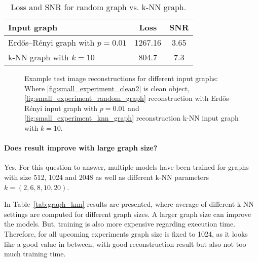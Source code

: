   \begin{table}[H]
    \centering
      \begin{tabular}{l|cc}
      \toprule
      \textbf{Input graph} & \textbf{Loss} & \textbf{SNR}  \\ 
      \midrule
      Erdős–Rényi graph with $p=0.01$    &  1267.16         &  3.65   \\ \hline
      k-NN graph with $k=10$             &  804.7           &  7.3    \\ \hline
      \midrule
      \end{tabular}
    \caption{Loss and SNR for random graph vs. k-NN graph. }
    \label{tab:input_graph}
  \end{table}
  
  \begin{figure}[H]
    \label{fig:input_graph_small}
    \hfill
    \hfill
    \hfill
    \hfill
	\caption{Example test image reconstructions for different input graphs:\\
  Where \ref{fig:small_experiment_clean2} is clean object, 
  \ref{fig:small_experiment_random_graph} reconstruction with Erdős–Rényi input graph with $p=0.01$ and 
  \ref{fig:small_experiment_knn_graph} reconstruction k-NN input graph with $k=10$.
  }
\end{figure}


  \paragraph{Does result improve with large graph size?}
  Yes.
  For this question to answer, multiple models have been trained for graphs with size 512, 1024 and 2048 
  as well as different k-NN parameters $k = (2,6,8,10,20)$.

  In Table~\ref{tab:graph_knn} results are presented, where average of different k-NN settings
  are computed for different graph sizes.
  A larger graph size can improve the models. 
  But, training is also more expensive regarding execution time. 
  Therefore, for all upcoming experiments graph size is fixed to 1024, as it looks like a good
  value in between, with good reconstruction result but also not too much training time.
  
